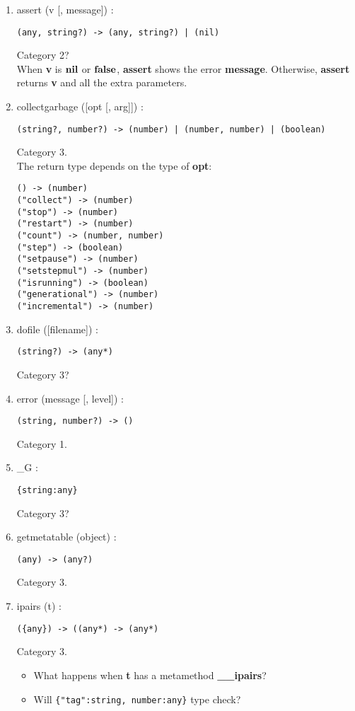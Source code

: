 \begin{enumerate}
\item assert (v [, message]) :
\begin{verbatim}
(any, string?) -> (any, string?) | (nil)
\end{verbatim}
Category 2?
\\
When \textbf{v} is $\mathbf{nil}$ or $\mathbf{false}$, \textbf{assert}
shows the error \textbf{message}.
Otherwise, \textbf{assert} returns \textbf{v} and all the extra
parameters.
\item collectgarbage ([opt [, arg]]) :
\begin{verbatim}
(string?, number?) -> (number) | (number, number) | (boolean)
\end{verbatim}
Category 3.
\\
The return type depends on the type of \textbf{opt}:
\begin{verbatim}
() -> (number)
("collect") -> (number)
("stop") -> (number)
("restart") -> (number)
("count") -> (number, number)
("step") -> (boolean)
("setpause") -> (number)
("setstepmul") -> (number)
("isrunning") -> (boolean)
("generational") -> (number)
("incremental") -> (number)
\end{verbatim}
\item dofile ([filename]) :
\begin{verbatim}
(string?) -> (any*)
\end{verbatim}
Category 3?
\item error (message [, level]) :
\begin{verbatim}
(string, number?) -> ()
\end{verbatim}
Category 1.
\item \_G :
\begin{verbatim}
{string:any}
\end{verbatim}
Category 3?
\item getmetatable (object) :
\begin{verbatim}
(any) -> (any?)
\end{verbatim}
Category 3.
\item ipairs (t) :
\begin{verbatim}
({any}) -> ((any*) -> (any*)
\end{verbatim}
Category 3.
\\
\begin{itemize}
\item What happens when \textbf{t} has a metamethod \textbf{\_\_ipairs}?
\item Will \texttt{\{"tag":string, number:any\}} type check?

\end{itemize}
\end{enumerate}
